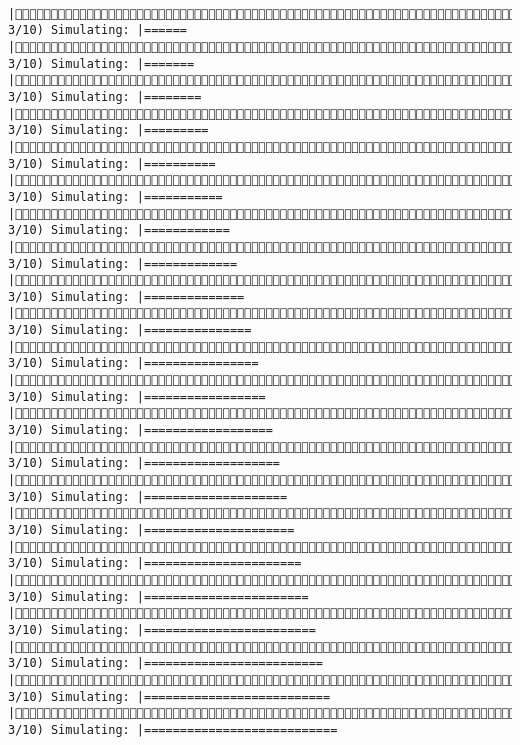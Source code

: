 \documentclass[]{article}
\begin{document}
\begin{verbatim}
             |( 3/10) Simulating: |======                                               |( 3/10) Simulating: |=======                                              |( 3/10) Simulating: |========                                             |( 3/10) Simulating: |=========                                            |( 3/10) Simulating: |==========                                           |( 3/10) Simulating: |===========                                          |( 3/10) Simulating: |============                                         |( 3/10) Simulating: |=============                                        |( 3/10) Simulating: |==============                                       |( 3/10) Simulating: |===============                                      |( 3/10) Simulating: |================                                     |( 3/10) Simulating: |=================                                    |( 3/10) Simulating: |==================                                   |( 3/10) Simulating: |===================                                  |( 3/10) Simulating: |====================                                 |( 3/10) Simulating: |=====================                                |( 3/10) Simulating: |======================                               |( 3/10) Simulating: |=======================                              |( 3/10) Simulating: |========================                             |( 3/10) Simulating: |=========================                            |( 3/10) Simulating: |==========================                           |( 3/10) Simulating: |===========================                          
\end{verbatim}
\end{document}
